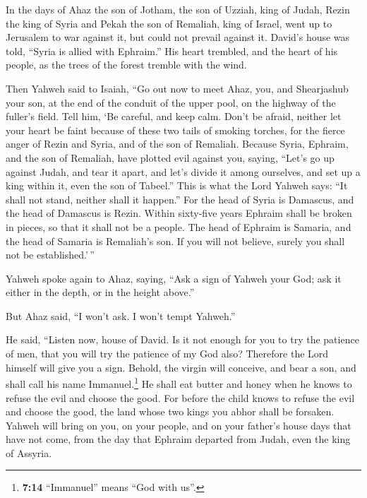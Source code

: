  In the days of Ahaz the son of Jotham, the son of Uzziah,
king of Judah, Rezin the king of Syria and Pekah the son of Remaliah,
king of Israel, went up to Jerusalem to war against it, but could not
prevail against it.  David's house was told, ``Syria is
allied with Ephraim.'' His heart trembled, and the heart of his people,
as the trees of the forest tremble with the wind.

 Then Yahweh said to Isaiah, ``Go out now to meet Ahaz,
you, and Shearjashub your son, at the end of the conduit of the upper
pool, on the highway of the fuller's field.  Tell him, `Be
careful, and keep calm. Don't be afraid, neither let your heart be faint
because of these two tails of smoking torches, for the fierce anger of
Rezin and Syria, and of the son of Remaliah.  Because
Syria, Ephraim, and the son of Remaliah, have plotted evil against you,
saying,  ``Let's go up against Judah, and tear it apart,
and let's divide it among ourselves, and set up a king within it, even
the son of Tabeel.''  This is what the Lord Yahweh says:
``It shall not stand, neither shall it happen.''  For the
head of Syria is Damascus, and the head of Damascus is Rezin. Within
sixty-five years Ephraim shall be broken in pieces, so that it shall not
be a people.  The head of Ephraim is Samaria, and the head
of Samaria is Remaliah's son. If you will not believe, surely you shall
not be established.'\,''

 Yahweh spoke again to Ahaz, saying, 
``Ask a sign of Yahweh your God; ask it either in the depth, or in the
height above.''

 But Ahaz said, ``I won't ask. I won't tempt Yahweh.''

 He said, ``Listen now, house of David. Is it not enough
for you to try the patience of men, that you will try the patience of my
God also?  Therefore the Lord himself will give you a
sign. Behold, the virgin will conceive, and bear a son, and shall call
his name Immanuel.\footnote{\textbf{7:14} ``Immanuel'' means ``God with
  us''.}  He shall eat butter and honey when he knows to
refuse the evil and choose the good.  For before the
child knows to refuse the evil and choose the good, the land whose two
kings you abhor shall be forsaken.  Yahweh will bring on
you, on your people, and on your father's house days that have not come,
from the day that Ephraim departed from Judah, even the king of Assyria.

